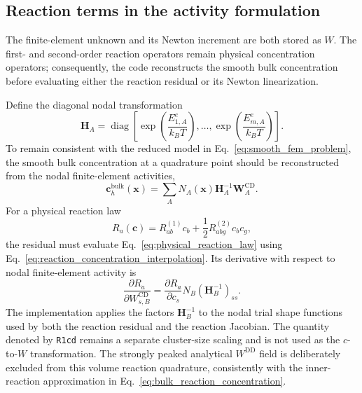 \documentclass[10pt]{article}
\begin{document}
\subsection{Reaction terms in the activity formulation}

The finite-element unknown and its Newton increment are both stored as $W$.
The first- and second-order reaction operators remain physical concentration
operators; consequently, the code reconstructs the smooth bulk concentration
before evaluating either the reaction residual or its Newton linearization.

Define the diagonal nodal transformation
\begin{equation}
    \boldsymbol{H}_A
    =
    \operatorname{diag}
    \left[
    \exp\left(\frac{E_{1,A}^e}{k_BT}\right),
    \ldots,
    \exp\left(\frac{E_{m,A}^e}{k_BT}\right)
    \right].
\end{equation}
To remain consistent with the reduced model in
Eq.~\eqref{eq:smooth_fem_problem}, the smooth bulk concentration at a
quadrature point should be reconstructed from the nodal finite-element
activities,
\begin{equation}
    \boldsymbol{c}^{\mathrm{bulk}}_h(\boldsymbol{x})
    =
    \sum_A
    N_A(\boldsymbol{x})
    \boldsymbol{H}_A^{-1}
    \boldsymbol{W}^{\mathrm{CD}}_A.
    \label{eq:reaction_concentration_interpolation}
\end{equation}
For a physical reaction law
\begin{equation}
    R_a(\boldsymbol{c})
    =
    R^{(1)}_{ab}c_b
    +
    \frac{1}{2}
    R^{(2)}_{abg}c_bc_g,
    \label{eq:physical_reaction_law}
\end{equation}
the residual must evaluate Eq.~\eqref{eq:physical_reaction_law} using
Eq.~\eqref{eq:reaction_concentration_interpolation}.  Its derivative with
respect to nodal finite-element activity is
\begin{equation}
    \frac{\partial R_a}{\partial W^{\mathrm{CD}}_{s,B}}
    =
    \frac{\partial R_a}{\partial c_s}
    N_B
    \left(\boldsymbol{H}_B^{-1}\right)_{ss}.
    \label{eq:reaction_W_jacobian}
\end{equation}
The implementation applies the factors $\boldsymbol{H}_B^{-1}$ to the nodal
trial shape functions used by both the reaction residual and the reaction
Jacobian.  The quantity denoted by \texttt{R1cd} remains a separate
cluster-size scaling and is not used as the $c$-to-$W$ transformation.  The
strongly peaked analytical
$W^{\mathrm{DD}}$ field is deliberately excluded from this volume reaction
quadrature, consistently with the inner-reaction approximation in
Eq.~\eqref{eq:bulk_reaction_concentration}.
\end{document}
